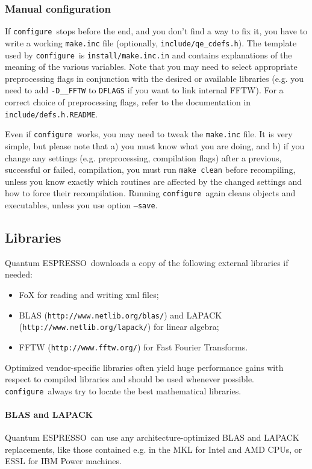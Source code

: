 \documentclass[12pt,a4paper]{article}
\def\qe{{\sc Quantum ESPRESSO}}
\def\configure{\texttt{configure}}
\begin{document}
\subsubsection{Manual configuration}
\label{SubSec:manconf}
If \configure\ stops before the end, and you don't find a way to fix
it, you have to write a working \texttt{make.inc} file (optionally,
\texttt{include/qe\_cdefs.h}). The template used by \configure\ is
\texttt{install/make.inc.in} and contains explanations of the meaning
of the various variables. Note that you may need
to select appropriate preprocessing flags
in conjunction with the desired or available
libraries (e.g. you need to add \texttt{-D\_\_FFTW} to \texttt{DFLAGS}
if you want to link internal FFTW). For a correct choice of preprocessing
flags, refer to the documentation in \texttt{include/defs.h.README}.

Even if \configure\ works, you may need to tweak the \texttt{make.inc}
file. It is very simple, but please note that a) you must know what you are
doing, and b) if you change any settings
(e.g. preprocessing, compilation flags)
after a previous, successful or failed, compilation, you must run
\texttt{make clean} before recompiling, unless you know exactly which
routines are affected by the changed settings and how to force their
recompilation. Running \configure\ again cleans objects and executables,
unless you use option \texttt{--save}.

\subsection{Libraries}
\label{Sec:Libraries}

\qe\ downloads a copy of the following external libraries if needed:
\begin{itemize}
 \item FoX for reading and writing xml files;
 \item BLAS (\texttt{http://www.netlib.org/blas/}) and LAPACK
  (\texttt{http://www.netlib.org/lapack/}) for linear algebra;
\item FFTW (\texttt{http://www.fftw.org/}) for Fast Fourier Transforms.
\end{itemize}
Optimized vendor-specific libraries often yield huge performance gains
with respect to compiled libraries and should be used whenever
possible. \configure\ always try to locate the best mathematical
libraries.
\\

\paragraph{BLAS and LAPACK}
\qe\ can use any architecture-optimized BLAS and LAPACK replacements,
like those contained e.g. in the MKL for Intel and AMD CPUs, or
ESSL for IBM Power machines.
\end{document}
